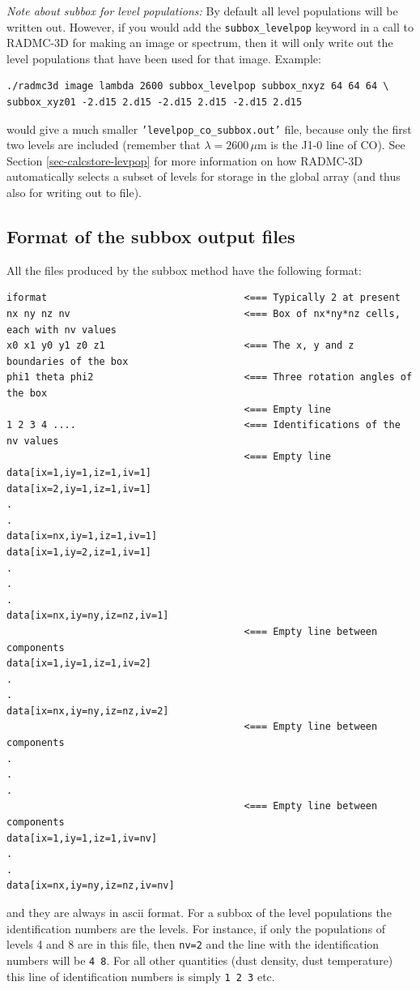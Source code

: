 \documentclass{report}
\newenvironment{asciibox}%
  {\begin{list}{}{%
    \setlength{\topsep}{0.5em}%
    \setlength{\parskip}{0em}%
    \setlength{\parsep}{0em}%
    \setlength{\itemsep}{0em}%
    \setlength{\rightmargin}{0em}%
    \setlength{\leftmargin}{3.0em}%
    \setlength{\labelsep}{1em}%
    \setlength{\labelwidth}{2em}%
  }\normalfont\footnotesize\item}
  {\end{list}}
\begin{document}
{\em Note about subbox for level populations:} By default all level populations
will be written out. However, if you would add the {\small\tt subbox\_levelpop}
keyword in a call to RADMC-3D for making an image or spectrum, then it will
only write out the level populations that have been used for that image. Example:
\begin{asciibox}\begin{verbatim}
./radmc3d image lambda 2600 subbox_levelpop subbox_nxyz 64 64 64 \
subbox_xyz01 -2.d15 2.d15 -2.d15 2.d15 -2.d15 2.d15
\end{verbatim}\end{asciibox}
would give a much smaller {\small\tt 'levelpop\_co\_subbox.out'} file, because
only the first two levels are included (remember that $\lambda=2600\,\mu$m is the
J1-0 line of CO). See Section \ref{sec-calcstore-levpop} for more information on
how RADMC-3D automatically selects a subset of levels for storage in the global
array (and thus also for writing out to file). 

\subsection{Format of the subbox output files}
All the files produced by the subbox method have the following format:
\begin{asciibox}\begin{verbatim}
iformat                                  <=== Typically 2 at present
nx ny nz nv                              <=== Box of nx*ny*nz cells, each with nv values
x0 x1 y0 y1 z0 z1                        <=== The x, y and z boundaries of the box
phi1 theta phi2                          <=== Three rotation angles of the box
                                         <=== Empty line 
1 2 3 4 ....                             <=== Identifications of the nv values 
                                         <=== Empty line 
data[ix=1,iy=1,iz=1,iv=1]
data[ix=2,iy=1,iz=1,iv=1]
.
.
data[ix=nx,iy=1,iz=1,iv=1]
data[ix=1,iy=2,iz=1,iv=1]
.
.
.
data[ix=nx,iy=ny,iz=nz,iv=1]
                                         <=== Empty line between components
data[ix=1,iy=1,iz=1,iv=2]
.
.
data[ix=nx,iy=ny,iz=nz,iv=2]
                                         <=== Empty line between components
.
.
.
                                         <=== Empty line between components
data[ix=1,iy=1,iz=1,iv=nv]
.
.
data[ix=nx,iy=ny,iz=nz,iv=nv]
\end{verbatim}\end{asciibox}
and they are always in ascii format. For a subbox of the level populations the
identification numbers are the levels. For instance, if only the populations of
levels 4 and 8 are in this file, then {\small\tt nv=2} and the line with
the identification numbers will be {\small\tt 4 8}. For all other quantities
(dust density, dust temperature) this line of identification numbers is simply
{\small\tt 1 2 3} etc.
\end{document}
